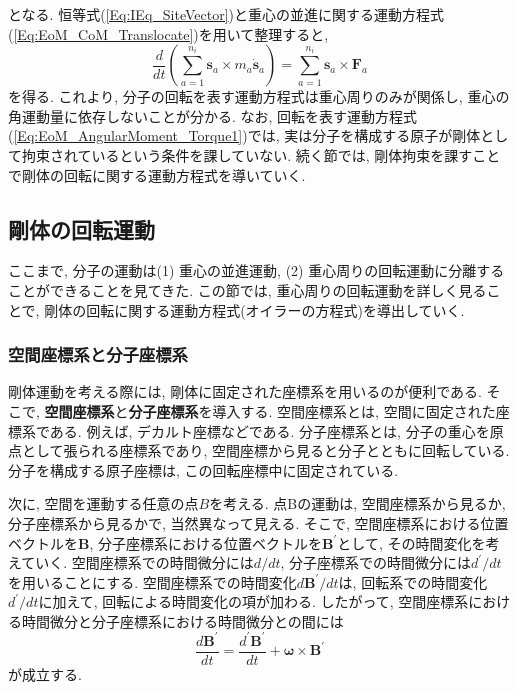 となる.
恒等式(\ref{Eq:IEq_SiteVector})と重心の並進に関する運動方程式(\ref{Eq:EoM_CoM_Translocate})を用いて整理すると,
\begin{equation}
  \frac{d}{dt}
  \left(
    \sum_{a=1}^{n_{i}}
    \bm{s}_{a} \times m_{a} \dot{\bm{s}}_{a}
  \right)
  =
  \sum_{a=1}^{n_{i}}
  \bm{s}_{a} \times \bm{F}_{a}
  \label{Eq:EoM_AngularMoment_Torque2}
\end{equation}
を得る. これより, 分子の回転を表す運動方程式は重心周りのみが関係し, 重心の角運動量に依存しないことが分かる. 
なお, 回転を表す運動方程式(\ref{Eq:EoM_AngularMoment_Torque1})では, 実は分子を構成する原子が剛体として拘束されているという条件を課していない.
続く節では, 剛体拘束を課すことで剛体の回転に関する運動方程式を導いていく.

\subsection{剛体の回転運動}

ここまで, 分子の運動は(1) 重心の並進運動, (2) 重心周りの回転運動に分離することができることを見てきた. この節では, 重心周りの回転運動を詳しく見ることで, 剛体の回転に関する運動方程式(オイラーの方程式)を導出していく.

\subsubsection{空間座標系と分子座標系}
剛体運動を考える際には, 剛体に固定された座標系を用いるのが便利である. 
そこで, \textbf{空間座標系}と\textbf{分子座標系}を導入する. 
空間座標系とは, 空間に固定された座標系である. 例えば, デカルト座標などである.
分子座標系とは, 分子の重心を原点として張られる座標系であり, 空間座標から見ると分子とともに回転している. 分子を構成する原子座標は, この回転座標中に固定されている.

次に, 空間を運動する任意の点$B$を考える.
点Bの運動は, 空間座標系から見るか, 分子座標系から見るかで, 当然異なって見える.
そこで, 空間座標系における位置ベクトルを$\bm{B}$, 分子座標系における位置ベクトルを$\bm{B}^{\prime}$として, その時間変化を考えていく.
空間座標系での時間微分には$d/dt$, 分子座標系での時間微分には$d^{\prime}/dt$を用いることにする.
空間座標系での時間変化$d\bm{B}^{\prime}/dt$は, 回転系での時間変化$d^{\prime}/dt$に加えて, 回転による時間変化の項が加わる.
したがって, 空間座標系における時間微分と分子座標系における時間微分との間には
\begin{equation}
  \frac{d\bm{B}^{\prime}}{dt}
  =
  \frac{d^{\prime}\bm{B}^{\prime}}{dt}
  +
  \bm{\omega} \times \bm{B}^{\prime}
  \label{Eq:time_dev_coordinate}
\end{equation}
が成立する.

